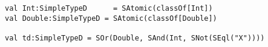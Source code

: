 \begin{lstlisting}[style=scalaioScala]
val Int:SimpleTypeD      = SAtomic(classOf[Int])
val Double:SimpleTypeD = SAtomic(classOf[Double])

val td:SimpleTypeD = SOr(Double, SAnd(Int, SNot(SEql("X"))))
\end{lstlisting}
